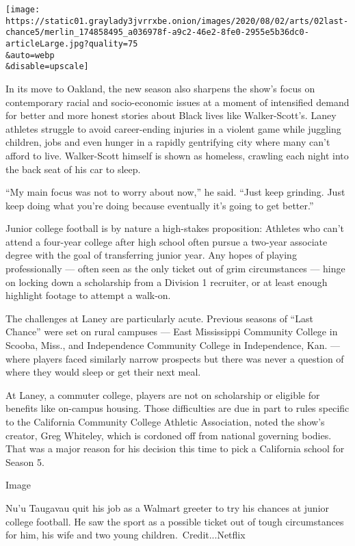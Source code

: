 \texttt{[image: https://static01.graylady3jvrrxbe.onion/images/2020/08/02/arts/02last-chance5/merlin\_174858495\_a036978f-a9c2-46e2-8fe0-2955e5b36dc0-articleLarge.jpg?quality=75\\\&auto=webp\\\&disable=upscale]}

In its move to Oakland, the new season also sharpens the show's focus on
contemporary racial and socio-economic issues at a moment of intensified
demand for better and more honest stories about Black lives like
Walker-Scott's. Laney athletes struggle to avoid career-ending injuries
in a violent game while juggling children, jobs and even hunger in a
rapidly gentrifying city where many can't afford to live. Walker-Scott
himself is shown as homeless, crawling each night into the back seat of
his car to sleep.

``My main focus was not to worry about now,'' he said. ``Just keep
grinding. Just keep doing what you're doing because eventually it's
going to get better.''

Junior college football is by nature a high-stakes proposition: Athletes
who can't attend a four-year college after high school often pursue a
two-year associate degree with the goal of transferring junior year. Any
hopes of playing professionally --- often seen as the only ticket out of
grim circumstances --- hinge on locking down a scholarship from a
Division 1 recruiter, or at least enough highlight footage to attempt a
walk-on.

The challenges at Laney are particularly acute. Previous seasons of
``Last Chance'' were set on rural campuses --- East Mississippi
Community College in Scooba, Miss., and Independence Community College
in Independence, Kan. --- where players faced similarly narrow prospects
but there was never a question of where they would sleep or get their
next meal.

At Laney, a commuter college, players are not on scholarship or eligible
for benefits like on-campus housing. Those difficulties are due in part
to rules specific to the California Community College Athletic
Association, noted the show's creator, Greg Whiteley, which is cordoned
off from national governing bodies. That was a major reason for his
decision this time to pick a California school for Season 5.

Image

Nu'u Taugavau quit his job as a Walmart greeter to try his chances at
junior college football. He saw the sport as a possible ticket out of
tough circumstances for him, his wife and two young
children.~Credit...Netflix

